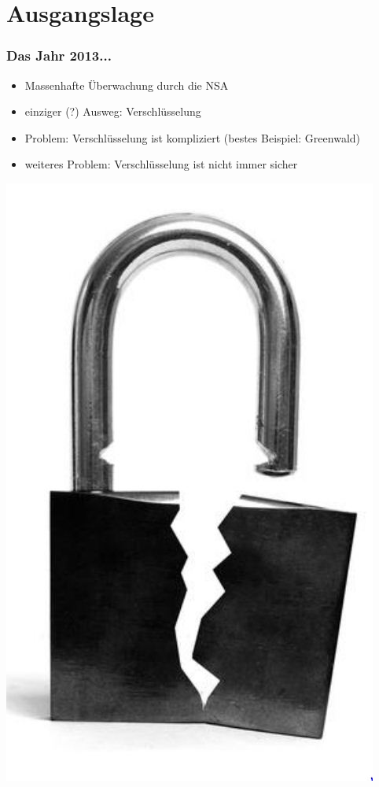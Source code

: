 \documentclass[10pt,compress]{beamer}
\begin{document}
\section{Ausgangslage}
\frame
{
  \frametitle{Das Jahr 2013...}

  \begin{itemize}
    \item Massenhafte Überwachung durch die NSA
    \item einziger (?) Ausweg: Verschlüsselung
    \item Problem: Verschlüsselung ist kompliziert (bestes Beispiel: Greenwald)
    \item weiteres Problem: Verschlüsselung ist nicht immer sicher
  \end{itemize}

  \vfill
  \hfill
  \includegraphics[scale=0.15]{broken.jpg}

}
\end{document}
